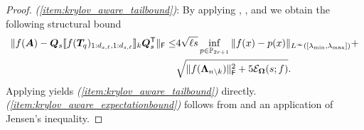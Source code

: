 \begin{proof}
\textit{(\ref*{item:krylov_aware_tailbound})}: By applying , , and  we obtain the following structural bound %
\begin{align}
\begin{split}
        \|f(\bm{A}) - \bm{Q}_s \llbracket f(\bm{T}_q)_{1:d_{s,\ell},1:d_{s,\ell}}\rrbracket_{k} \bm{Q}_s^{\textsf{\textup{T}}}\|_{\textsf{\textup{F}}} \leq &4\sqrt{\ell s}  \inf\limits_{p \in \mathbb{P}_{2r+1}}\|f(x)-p(x)\|_{L^{\infty}([\lambda_{\min},\lambda_{\max}])} +\\
        &\sqrt{\|f(\bm{\Lambda}_{n \setminus k })\|_{\textsf{\textup{F}}}^2 +  5 \mathcal{E}_{\bm{\Omega}}(s;f)}.
        \end{split}\label{eq:krylov_aware_structural}
\end{align}
Applying  yields \textit{(\ref*{item:krylov_aware_tailbound})} directly. 
\textit{(\ref*{item:krylov_aware_expectationbound})} follows from  and an application of Jensen's inequality.
\end{proof}

